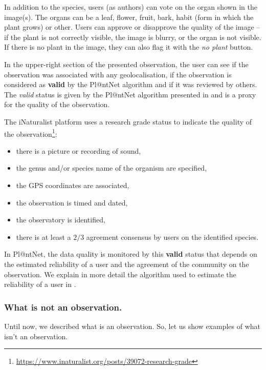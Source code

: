 In addition to the species, users (as authors) can vote on the organ shown in the image(s).
The organs can be a leaf, flower, fruit, bark, habit (form in which the plant grows) or other.
Users can approve or disapprove the quality of the image -- if the plant is not correctly visible, the image is blurry, or the organ is not visible.
If there is no plant in the image, they can also flag it with the \emph{no plant} button.

In the upper-right section of the presented observation, the user can see if the observation was associated with any geolocalisation, if the observation is considered as \textbf{valid} by the Pl@ntNet algorithm and if it was reviewed by others.
The \emph{valid} status is given by the Pl@ntNet algorithm presented in  and is a proxy for the quality of the observation.

The iNaturalist platform uses a research grade status to indicate the quality of the observation\footnote{\url{https://www.inaturalist.org/posts/39072-research-grade}}:
\begin{itemize}
        \item there is a picture or recording of sound,
        \item the genus and/or species name of the organism are specified,
        \item the GPS coordinates are associated,
        \item the observation is timed and dated,
        \item the observatory is identified,
        \item there is at least a $2/3$ agreement consensus by users on the identified species.
\end{itemize}
In Pl@ntNet, the data quality is monitored by this \textbf{valid} status that depends on the estimated reliability of a user and the agreement of the community on the observation.
We explain in more detail the algorithm used to estimate the reliability of a user in .

\subsubsection{What is not an observation.}

Until now, we described what is an observation.
So, let us show examples of what isn't an observation.

